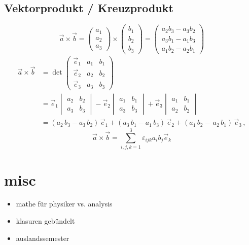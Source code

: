 \documentclass[11pt]{article}
\begin{document}
\subsection{Vektorprodukt / Kreuzprodukt}
\label{sec-13-4}
\begin{equation}
\vec{a}\times\vec{b}
=
\begin{pmatrix}a_1 \\ a_2 \\ a_3\end{pmatrix}
\times
\begin{pmatrix}b_1 \\ b_2 \\ b_3 \end{pmatrix}
=
\begin{pmatrix}
a_2b_3 - a_3b_2 \\
a_3b_1 - a_1b_3 \\
a_1b_2 - a_2b_1
\end{pmatrix}
\end{equation}
  \begin{align}
  \vec a \times \vec b &=\det \begin{pmatrix}\vec e_1 & a_1 & b_1 \\ \vec e_2 & a_2 & b_2 \\ \vec e_3 & a_3 & b_3\end{pmatrix}\\
  &= \vec e_1 \begin{vmatrix} a_2 & b_2 \\ a_3 & b_3 \end{vmatrix}
- \vec e_2 \begin{vmatrix} a_1 & b_1 \\ a_3 & b_3 \end{vmatrix}
+ \vec e_3 \begin{vmatrix} a_1 & b_1 \\ a_2 & b_2 \end{vmatrix} \\
&= (a_2 \,b_3 - a_3 \, b_2) \, \vec e_1 + (a_3 \, b_1 - a_1 \, b_3) \, \vec e_2 + (a_1 \, b_2 - \, a_2 \, b_1) \, \vec e_3 \,,
\end{align}
\[\vec{a}\times\vec{b} = \sum_{i,j,k=1}^3 \varepsilon_{ijk} a_i b_j \vec e_k\]
\section{misc}
\label{sec-14}
\begin{itemize}
\item mathe für physiker vs. analysis
\item klasuren gebündelt
\item auslandssemester
\end{itemize}
\end{document}
